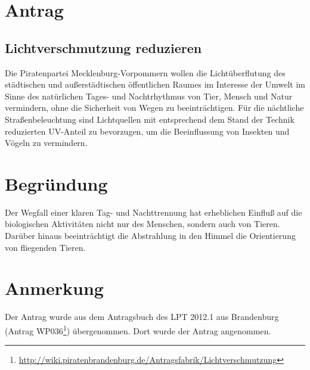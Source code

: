 \section{Antrag}

\subsection{Lichtverschmutzung reduzieren}

Die Piratenpartei Mecklenburg-Vorpommern wollen die Lichtüberflutung des städtischen und außerstädtischen öffentlichen Raumes im Interesse der Umwelt im Sinne des natürlichen Tages- und Nachtrhythmus von Tier, Mensch und Natur vermindern, ohne die Sicherheit von Wegen zu beeinträchtigen. Für die nächtliche Straßenbeleuchtung sind Lichtquellen mit entsprechend dem Stand der Technik reduzierten UV-Anteil zu bevorzugen, um die Beeinflussung von Insekten und Vögeln zu vermindern.

\section{Begründung}

Der Wegfall einer klaren Tag- und Nachttrennung hat erheblichen Einfluß auf die biologischen Aktivitäten nicht nur des Menschen, sondern auch von Tieren. Darüber hinaus beeinträchtigt die Abstrahlung in den Himmel die Orientierung von fliegenden Tieren.

\section{Anmerkung}

Der Antrag wurde aus dem Antragsbuch des LPT 2012.1 aus Brandenburg (Antrag WP036\footnote{\url{http://wiki.piratenbrandenburg.de/Antragsfabrik/Lichtverschmutzung}}) übergenommen. Dort wurde der Antrag angenommen.
